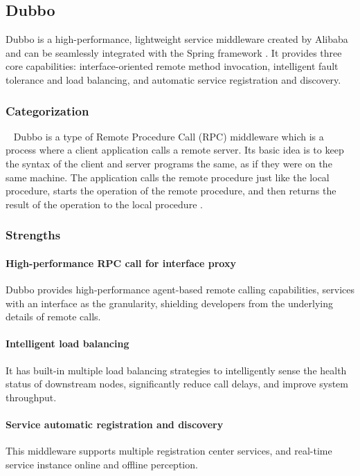 \documentclass[conference]{IEEEtran}
\begin{document}
\subsection{Dubbo}

Dubbo is a high-performance, lightweight service middleware created by Alibaba and can be seamlessly integrated with the Spring framework \cite{b6}. It provides three core capabilities: interface-oriented remote method invocation, intelligent fault tolerance and load balancing, and automatic service registration and discovery.

\subsubsection{Categorization}
\
\newline
\indent
Dubbo is a type of Remote Procedure Call (RPC) middleware which is a process where a client application calls a remote server. Its basic idea is to keep the syntax of the client and server programs the same, as if they were on the same machine. The application calls the remote procedure just like the local procedure, starts the operation of the remote procedure, and then returns the result of the operation to the local procedure \cite{b7}.

\subsubsection{Strengths}

\paragraph{High-performance RPC call for interface proxy}
Dubbo provides high-performance agent-based remote calling capabilities, services with an interface as the granularity, shielding developers from the underlying details of remote calls.

\paragraph{Intelligent load balancing}
It has built-in multiple load balancing strategies to intelligently sense the health status of downstream nodes, significantly reduce call delays, and improve system throughput.

\paragraph{Service automatic registration and discovery}
This middleware supports multiple registration center services, and real-time service instance online and offline perception.
\end{document}
